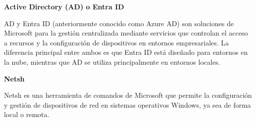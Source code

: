 \textbf{Active Directory (AD) o Entra ID}

AD\cite{microsoftADDS} y Entra ID\cite{microsoftEntra} (anteriormente conocido como Azure AD) son soluciones de Microsoft
para la gestión centralizada mediante servicios que controlan el acceso a recursos y la configuración de dispositivos
en entornos empresariales.
La diferencia principal entre ambos es que Entra ID está diseñado para entornos en la nube, mientras que AD se utiliza
principalmente en entornos locales.

\textbf{Netsh}

Netsh\cite{microsoftNetsh} es una herramienta de comandos de Microsoft que permite la configuración y gestión
de dispositivos de red en sistemas operativos Windows, ya sea de forma local o remota.

 \begin{table}[H]
        \centering
        \caption{Comparativa de las herramientas de los proyectos con codificación de colores.}
        \label{tab:comparativa-herramientas-proyectos}
 \end{table}

